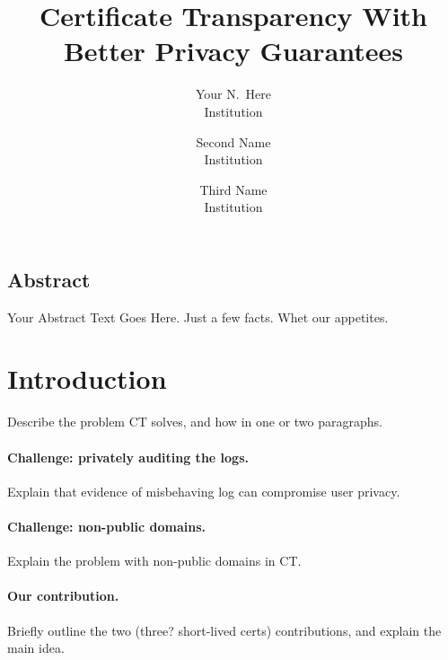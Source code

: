 \documentclass[letterpaper,twocolumn,10pt]{article}
\begin{document}
\date{}
 
\title{\Large \bf Certificate Transparency With Better Privacy Guarantees}

\author{
{\rm Your N.\ Here}\\
Institution
\and
{\rm Second Name}\\
Institution
\and
{\rm Third Name}\\
Institution
} %

\maketitle

\thispagestyle{empty}


\subsection*{Abstract}
Your Abstract Text Goes Here.  Just a few facts.
Whet our appetites.

\section{Introduction}

Describe the problem CT solves, and how in one or two paragraphs.

\paragraph{Challenge: privately auditing the logs.} 
Explain that evidence of misbehaving log can compromise user privacy.

\paragraph{Challenge: non-public domains.}
Explain the problem with non-public domains in CT.

\paragraph{Our contribution.}
Briefly outline the two (three? short-lived certs) contributions, and explain the main idea.
\end{document}
